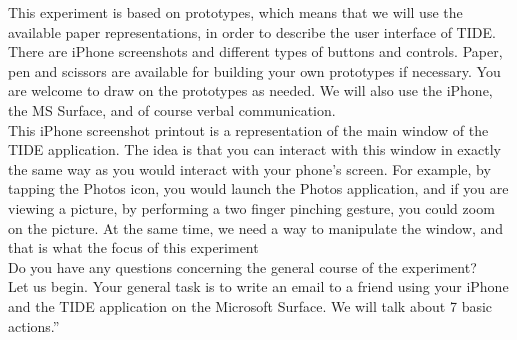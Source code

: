 This experiment is based on prototypes, which means that we will use the available paper representations, in order to describe the user interface of TIDE.
There are iPhone screenshots and different types of buttons and controls.
Paper, pen and scissors are available for building your own prototypes if necessary.
You are welcome to draw on the prototypes as needed.
We will also use the iPhone, the MS Surface, and of course verbal communication.
\hfill\\
This iPhone screenshot printout is a representation of the main window of the TIDE application.
The idea is that you can interact with this window in exactly the same way as you would interact with your phone's screen.
For example, by tapping the Photos icon, you would launch the Photos application, and if you are viewing a picture, by performing a two finger pinching gesture, you could zoom on the picture.
At the same time, we need a way to manipulate the window, and that is what the focus of this experiment
\hfill\\
Do you have any questions concerning the general course of the experiment?
\hfill\\
Let us begin.
Your general task is to write an email to a friend using your iPhone and the TIDE application on the Microsoft Surface.
We will talk about 7 basic actions.''

